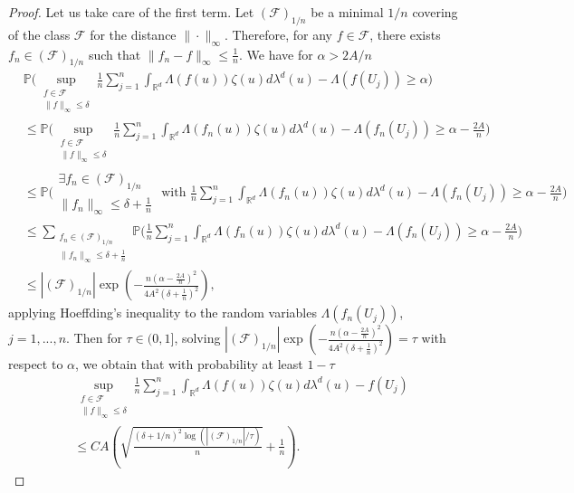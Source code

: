 \documentclass[10pt]{article}
\begin{document}
\begin{proof}
Let us take care of the first term. Let $(\mathcal{F})_{1/n}$ be a minimal $1/n$ covering of the class $\mathcal{F}$ for the distance $\|\cdot\|_\infty$. Therefore, for any $f \in \mathcal{F}$, there exists $f_n\in (\mathcal{F})_{1/n}$ such that $\|f_n-f\|_\infty\leq \frac{1}{n}$. We have for $\alpha>2A/n$ 
\begin{align}\label{align:boundonprobacovering}
     & \mathbb{P}\Big(\sup \limits_{\substack{f\in \mathcal{F} \\ \|f\|_\infty\leq \delta}}  \frac{1}{n}\sum_{j=1}^n  \int_{\mathbb{R}^d}\Lambda(f(u))\zeta(u)d\lambda^d(u)-\Lambda(f(U_j)) \geq \alpha \Big)\nonumber\\
     & \leq \mathbb{P}\Big( \sup \limits_{\substack{f\in \mathcal{F} \\ \|f\|_\infty\leq \delta}}  \frac{1}{n}\sum_{j=1}^n  \int_{\mathbb{R}^d}\Lambda(f_n(u))\zeta(u)d\lambda^d(u)-\Lambda(f_n(U_j)) \geq \alpha -\frac{2A}{n} \Big)\nonumber\\
    & \leq \mathbb{P}\Big( \substack{\exists f_n\in (\mathcal{F})_{1/n}\\ \|f_n \|_\infty\leq \delta+\frac{1}{n}} \text{ with } \frac{1}{n}\sum_{j=1}^n  \int_{\mathbb{R}^d}\Lambda(f_n(u))\zeta(u)d\lambda^d(u)-\Lambda(f_n(U_j)) \geq \alpha -\frac{2A}{n} \Big)\nonumber\\
    & \leq \sum \limits_{\substack{f_n\in (\mathcal{F})_{1/n}\\ \|f_n\|_\infty\leq \delta+\frac{1}{n}}}  \mathbb{P}\Big( \frac{1}{n}\sum_{j=1}^n  \int_{\mathbb{R}^d}\Lambda(f_n(u))\zeta(u)d\lambda^d(u)-\Lambda(f_n(U_j)) \geq \alpha -\frac{2A}{n} \Big)\nonumber\\
    & \leq |(\mathcal{F})_{1/n}|  \exp\left(-\frac{n(\alpha -\frac{2A}{n})^2}{4A^2(\delta+\frac{1}{n})^2}\right),
\end{align}
applying Hoeffding's inequality to the random variables $\Lambda(f_n(U_j)) $, $j=1,...,n$. Then for $\tau \in (0,1]$, solving $|(\mathcal{F})_{1/n}|  \exp\left(-\frac{n(\alpha -\frac{2A}{n})^2}{4A^2(\delta+\frac{1}{n})^2}\right)=\tau$ with respect to $\alpha$, we obtain that with probability at least $1-\tau$
\begin{align*}
& \sup \limits_{\substack{f\in \mathcal{F} \\ \|f\|_\infty\leq \delta}}  \frac{1}{n}\sum_{j=1}^n  \int_{\mathbb{R}^d}\Lambda(f(u))\zeta(u)d\lambda^d(u)-f(U_j) \\
& \leq CA\left(\sqrt{\frac{(\delta+1/n)^2\log(|(\mathcal{F})_{1/n}|/\tau)}{n} }+\frac{1}{n}\right).

\end{align*}
\end{proof}
\end{document}
